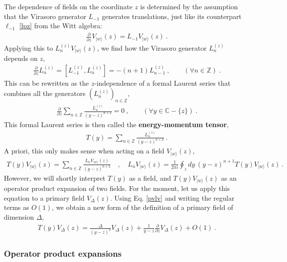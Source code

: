 \documentclass[12pt, a4paper]{article}
\theoremstyle{break}
\begin{document}
The dependence of fields on the coordinate $z$ is determined by the assumption that the Virasoro generator $L_{-1}$ generates translations, just like its counterpart $\ell_{-1}$ \eqref{lpz} from the Witt algebra:
\begin{align}
  \boxed{\frac{\partial}{\partial z} V_{|w\rangle}(z) = L_{-1} V_{|w\rangle}(z)}  \ .
  \label{pvlv}
 \end{align}
 Applying this to $L_n^{(z)} V_{|w\rangle}(z)$, we find how the Virasoro generator $L_n^{(z)}$ depends on $z$,
 \begin{align}
 \frac{\partial}{\partial z} L_n^{(z)} = [L_{-1}^{(z)},L_n^{(z)}]= -(n+1)L_{n-1}^{(z)}\ ,\qquad (\forall n\in\mathbb{Z})\ .
\end{align}
This can be rewritten as the $z$-independence of a formal Laurent series that combines all the generators $(L_n^{(z)})_{n\in\mathbb{Z}}$, 
\begin{align}
 \frac{\partial}{\partial z} \sum_{n\in\mathbb{Z}} \frac{L_n^{(z)}}{(y-z)^{n+2}} = 0\ ,\qquad (\forall y\in\mathbb{C}-\{z\})\ .
\end{align}
This formal Laurent series is then called the \textbf{energy-momentum tensor}, 
\begin{align}
  \boxed{T(y) = \sum_{n\in\mathbb{Z}} \frac{L_n^{(z)}}{(y-z)^{n+2}}} \ .
 \end{align}
 A priori, this only makes sense when acting on a field $V_{|w\rangle}(z)$,
 \begin{align}
 T(y)V_{|w\rangle}(z) = \sum_{n\in\mathbb{Z}} \frac{L_n V_{|w\rangle}(z)}{(y-z)^{n+2}}\quad , \quad L_n V_{|w\rangle}(z) = \frac{1}{2\pi i} \oint_{z}dy\ (y-z)^{n+1} T(y)V_{|w\rangle}(z)\ .
 \label{eq:lvtv}
\end{align}
However, we will shortly interpret $T(y)$ as a field, and $T(y)V_{|w\rangle}(z)$ as an operator product expansion of two fields. For the moment, let us apply this equation to a primary field $V_\Delta(z)$. Using Eq. \eqref{pvlv} and writing the regular terms as $O(1)$, we obtain a new form of the definition of a primary field of dimension $\Delta$,
\begin{align}
 \boxed{T(y)V_\Delta(z) = \frac{\Delta}{(y-z)^2} V_\Delta(z) + \frac{1}{y-z} \frac{\partial}{\partial z} V_\Delta(z) + O(1)}\ . 
 \label{eq:tvd}
\end{align}

\subsubsection{Operator product expansions}\label{sec:ope}
\end{document}
